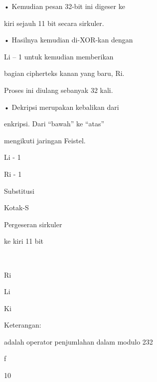 \documentclass{article}
\begin{document}

• Kemudian pesan 32-bit ini digeser ke 

kiri sejauh 11 bit secara sirkuler. 

• Hasilnya kemudian di-XOR-kan dengan 

Li – 1  untuk kemudian memberikan 

bagian cipherteks kanan yang baru, Ri. 

Proses ini diulang sebanyak 32 kali. 

• Dekripsi merupakan kebalikan dari 

enkripsi. Dari “bawah” ke “atas” 

mengikuti jaringan Feistel. 

Li - 1

Ri - 1

Substitusi

Kotak-S

Pergeseran sirkuler

ke kiri 11 bit



Ri

Li

Ki

Keterangan:

adalah operator penjumlahan dalam modulo 232

f

10
\end{document}
